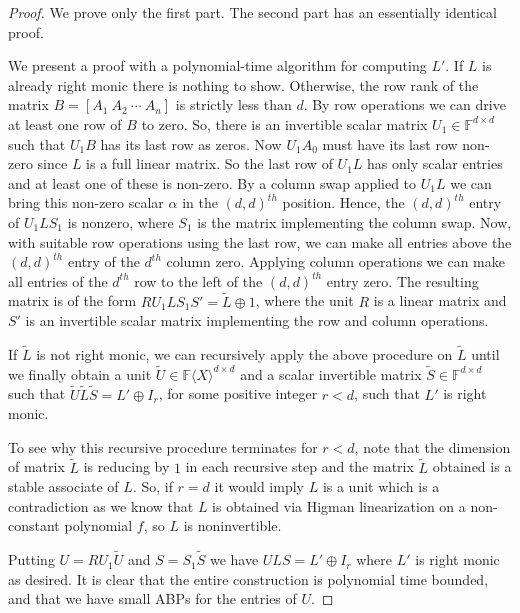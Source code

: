 \documentclass[10pt,a4paper]{article}
\newcommand{\F}{\mathbb{F}}
\renewcommand{\angle}[1]{\langle #1 \rangle}
\newcommand{\FX}{\F\angle{X}}
\newcommand{\fR}{\FX}
\begin{document}
\begin{proof}
We prove only the first part. The second part has an essentially
identical proof.

We present a proof with a polynomial-time algorithm for computing
$L'$. If $L$ is already right monic there is nothing to
show. Otherwise, the row rank of the matrix $B = [A_1~A_2~\cdots~A_n]$
is strictly less than $d$. By row operations we can drive at least one
row of $B$ to zero. So, there is an invertible scalar matrix $U_1\in
\F^{d\times d}$ such that $U_1B$ has its last row as zeros. Now
$U_1A_0$ must have its last row non-zero since $L$ is a full linear
matrix. So the last row of $U_1L$ has only scalar entries and at least
one of these is non-zero. By a column swap applied to $U_1L$ we can
bring this non-zero scalar $\alpha$ in the $(d,d)^{th}$
position. Hence, the $(d,d)^{th}$ entry of $U_1LS_1$ is nonzero, where
$S_1$ is the matrix implementing the column swap. Now, with suitable
row operations using the last row, we can make all entries above the
$(d,d)^{th}$ entry of the $d^{th}$ column zero. Applying column
operations we can make all entries of the $d^{th}$ row to the left of
the $(d,d)^{th}$ entry zero. The resulting matrix is of the form
$RU_1LS_1S' = \tilde{L}\oplus 1$, where the unit $R$ is a linear
matrix and $S'$ is an invertible scalar matrix implementing the row
and column operations.

If $\tilde{L}$ is not right monic, we can recursively apply the above
procedure on $\tilde{L}$ until we finally obtain a unit
$\tilde{U}\in\fR^{d\times d}$ and a scalar invertible matrix
$\tilde{S}\in\F^{d\times d}$ such that $\tilde{U}\tilde{L} \tilde{S}=
L' \oplus I_r$, for some positive integer $r<d$, such that $L'$ is
right monic.

%
%
%
%
%
%
%
%
%
%

%
%
%
%

%
%
%
%

To see why this recursive procedure terminates for $r<d$, note that
the dimension of matrix $\tilde{L}$ is reducing by $1$ in each
recursive step and the matrix $\tilde{L}$ obtained is a stable
associate of $L$. So, if $r=d$ it would imply $L$ is a unit which is a
contradiction as we know that $L$ is obtained via Higman linearization
on a non-constant polynomial $f$, so $L$ is noninvertible.

Putting $U=RU_1\tilde{U}$ and $S=S_1\tilde{S}$ we have $ULS=L'\oplus
I_r$ where $L'$ is right monic as desired. It is clear that the entire
construction is polynomial time bounded, and that we have small ABPs
for the entries of $U$.
\end{proof}
\end{document}
